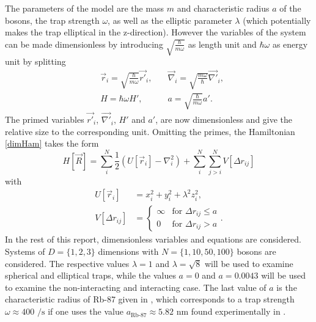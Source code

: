 \documentclass[a4paper,8pt]{article}
\begin{document}
\begin{multicols}{2}
The parameters of the model are the mass $m$ and characteristic radius $a$ of the bosons, the trap strength $\omega$, as well as the elliptic parameter $\lambda$ (which potentially makes the trap elliptical in the z-direction). However the variables of the system can be made dimensionless by introducing $\sqrt{\frac{\hbar}{m\omega}}$ as length unit and $\hbar\omega$ as energy unit by splitting
\begin{align}
&\vec{r}_i = \sqrt{\frac{\hbar}{m\omega}}\vec{r'}_i, \quad &\vec{\nabla}_i = \sqrt{\frac{m\omega}{\hbar}}\vec{\nabla'}_i, \nonumber\\
&H = \hbar\omega H', \quad\quad &a = \sqrt{\frac{\hbar}{m\omega}}a'. \nonumber
\end{align}
The primed variables $\vec{r'}_i$, $\vec{\nabla'}_i$, $H'$ and $a'$, are now dimensionless and give the relative size to the corresponding unit. Omitting the primes, the Hamiltonian \eqref{dimHam} takes the form
\begin{equation}\label{Ham}
H[\vec{R}] = \sum\limits_i^N \frac{1}{2}\left( U[\vec{r}_i] - {\nabla}_i^2\right) + \sum\limits_i^N\sum\limits_{j > i}^N V[\Delta{r}_{ij}]
\end{equation}
with
\begin{align}
U[\vec{r}_i] &= x_i^2+y_i^2+\lambda^2z_i^2, \label{U}\\
V[\Delta{r}_{ij}] &=\begin{cases} \infty & \text{for $\Delta{r}_{ij} \leq a$} \\
0 & \text{for $\Delta{r}_{ij} > a$} \end{cases}. \label{V}
\end{align}
In the rest of this report, dimensionless variables and equations are considered. Systems of $D = \{1,2,3\}$ dimensions with $N = \{1,10,50,100\}$ bosons are considered. The respective values $\lambda = 1$ and $\lambda = \sqrt{8}$ will be used to examine spherical and elliptical traps, while the values $a = 0$ and $a = 0.0043$ will be used to examine the non-interacting and interacting case. The last value of $a$ is the characteristic radius of Rb-87 given in \cite{DBG}, which corresponds to a trap strength $\omega \approx 400\text{ /s}$ if one uses the value $a_\text{Rb-87} \approx 5.82\text{ nm}$ found experimentally in \cite{BTGHV}.



\end{multicols}
\end{document}
